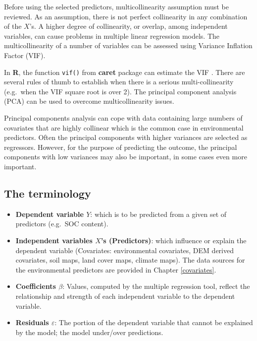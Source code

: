 \documentclass[10pt,b5paper,]{book}
\providecommand{\tightlist}{%
  \setlength{\itemsep}{0pt}\setlength{\parskip}{0pt}}
\theoremstyle{definition}
\theoremstyle{definition}
\theoremstyle{definition}
\theoremstyle{remark}
\begin{document}
Before using the selected predictors, multicollinearity assumption must
be reviewed. As an assumption, there is not perfect collinearity in any
combination of the \(X\)'s. A higher degree of collinearity, or overlap,
among independent variables, can cause problems in multiple linear
regression models. The multicollinearity of a number of variables can be
assessed using Variance Inflation Factor (VIF).

In \textbf{R}, the function \texttt{vif()} from \textbf{caret} package
can estimate the VIF . There are
several rules of thumb to establish when there is a serious
multi-collinearity (e.g.~when the VIF square root is over 2). The
principal component analysis (PCA) can be used to overcome
multicollinearity issues.

Principal components analysis can cope with data containing large
numbers of covariates that are highly collinear which is the common case
in environmental predictors. Often the principal components with higher
variances are selected as regressors. However, for the purpose of
predicting the outcome, the principal components with low variances may
also be important, in some cases even more important.

\hypertarget{the-terminology}{%
\subsection{The terminology}\label{the-terminology}}

\begin{itemize}
\tightlist
\item
  \textbf{Dependent variable \(Y\)}:  which is
  to be predicted from a given set of predictors (e.g.~SOC content).
\item
  \textbf{Independent variables \(X\)'s (Predictors)}: which influence
  or explain the dependent variable (Covariates: environmental
  covariates, DEM derived covariates, soil maps, land cover maps,
  climate maps). The data sources for the environmental predictors are
  provided in Chapter \ref{covariates}.
\item
  \textbf{Coefficients \(\beta\)}: Values, computed by the multiple
  regression tool, reflect the relationship and strength of each
  independent variable to the dependent variable.
\item
  \textbf{Residuals \(\varepsilon\)}: The portion of the dependent
  variable that cannot be explained by the model; the model under/over
  predictions.
\end{itemize}
\end{document}
